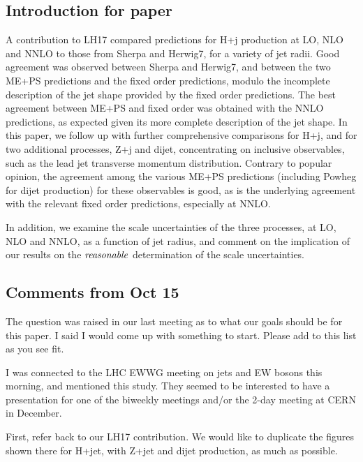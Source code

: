 \documentclass[aps,prd,onecolumn,fleqn,superscriptaddress,groupedaddress,nofootinbib,preprintnumbers,nobalancelastpage]{revtex4}
\begin{document}
\subsection{Introduction for paper}

A contribution to LH17 compared predictions for H+j production at LO, NLO and NNLO to those from Sherpa and Herwig7, for a variety of jet radii. Good agreement was observed between Sherpa and Herwig7, and between the two ME+PS predictions and the fixed order predictions, modulo the incomplete description of the jet shape provided by the fixed order predictions. The best agreement between ME+PS and fixed order was obtained with the NNLO predictions, as expected given its more complete description of the jet shape. In this paper, we follow up with further comprehensive comparisons for H+j, and for two additional processes, Z+j and dijet, concentrating on inclusive observables, such as the lead jet transverse momentum distribution. Contrary to popular opinion, the agreement among the various ME+PS predictions (including Powheg for dijet production) for these observables is good, as is the underlying agreement with the relevant fixed order predictions, especially at NNLO. 

In addition, we examine the scale uncertainties of the three processes, at LO, NLO and NNLO, as a function of jet radius, and comment on the implication of our results on the $\it reasonable$ determination of the scale uncertainties. 

\subsection{Comments from Oct 15}

The question was raised in our last meeting as to what our goals should be for this paper. I said I would come up with something to start. Please add to this list as you see fit. 

I was connected to the LHC EWWG meeting on jets and EW bosons this morning, and mentioned this study. They seemed to be interested to have a presentation for one of the biweekly meetings and/or the 2-day meeting at CERN in December. 

First, refer back to our LH17 contribution. We would like to duplicate the figures shown there for H+jet, with Z+jet and dijet production, as much as possible. 
\end{document}
